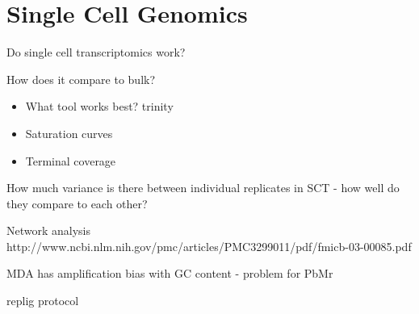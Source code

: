 \graphicspath{{chapters/5.Chapter_3/figures}}

\chapter{Single Cell Genomics}

Do single cell transcriptomics work?

How does it compare to bulk? 
\begin{itemize}
    \item What tool works best? trinity
    \item Saturation curves
    \item Terminal coverage
\end{itemize}

How much variance is there between individual replicates in SCT - how well do they compare to each other?



Network analysis
http://www.ncbi.nlm.nih.gov/pmc/articles/PMC3299011/pdf/fmicb-03-00085.pdf



MDA has amplification bias with GC content - problem for PbMr \citep{Macaulay2014}

replig protocol \citep{Korfhage2013}

